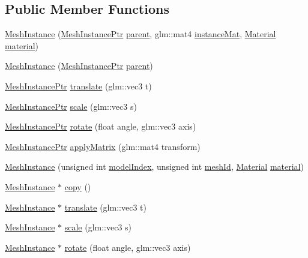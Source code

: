 \subsection*{Public Member Functions}
\begin{DoxyCompactItemize}
\item 
\hyperlink{class_mesh_instance_a0433e083188a2bef4f193032bba3b21f}{Mesh\+Instance} (\hyperlink{class_mesh_instance_ptr}{Mesh\+Instance\+Ptr} \hyperlink{class_mesh_instance_ad248a44f589cbeb5a8ec8748afebdcd8}{parent}, glm\+::mat4 \hyperlink{class_mesh_instance_a4ed7a3e07affd6862213ff054caa1b30}{instance\+Mat}, \hyperlink{struct_material}{Material} \hyperlink{class_mesh_instance_adba237cd83810b3afa89f1b911997e17}{material})
\item 
\hyperlink{class_mesh_instance_a9489df3dba59756832ad3789d6ae6b19}{Mesh\+Instance} (\hyperlink{class_mesh_instance_ptr}{Mesh\+Instance\+Ptr} \hyperlink{class_mesh_instance_ad248a44f589cbeb5a8ec8748afebdcd8}{parent})
\item 
\hyperlink{class_mesh_instance_ptr}{Mesh\+Instance\+Ptr} \hyperlink{class_mesh_instance_a0fa7328a13f39ddecefbd791bb8a60d4}{translate} (glm\+::vec3 t)
\item 
\hyperlink{class_mesh_instance_ptr}{Mesh\+Instance\+Ptr} \hyperlink{class_mesh_instance_a2f326744ece4345c59cfa56823693440}{scale} (glm\+::vec3 s)
\item 
\hyperlink{class_mesh_instance_ptr}{Mesh\+Instance\+Ptr} \hyperlink{class_mesh_instance_a63c843a137a99cdb24a06c8d3951c8a5}{rotate} (float angle, glm\+::vec3 axis)
\item 
\hyperlink{class_mesh_instance_ptr}{Mesh\+Instance\+Ptr} \hyperlink{class_mesh_instance_a76c43b6e1efab3b95027fdf7fc17a97d}{apply\+Matrix} (glm\+::mat4 transform)
\item 
\hyperlink{class_mesh_instance_a130ba9587f476a8897f704eaed1ebded}{Mesh\+Instance} (unsigned int \hyperlink{class_mesh_instance_a969bc28f038cda422be9efe24c308b58}{model\+Index}, unsigned int \hyperlink{class_mesh_instance_aec954bfbb05fd9d2e4da020ca61b8c35}{mesh\+Id}, \hyperlink{struct_material}{Material} \hyperlink{class_mesh_instance_adba237cd83810b3afa89f1b911997e17}{material})
\item 
\hyperlink{class_mesh_instance}{Mesh\+Instance} $\ast$ \hyperlink{class_mesh_instance_afdb729a6fbb69dcbf75dd926344cecac}{copy} ()
\item 
\hyperlink{class_mesh_instance}{Mesh\+Instance} $\ast$ \hyperlink{class_mesh_instance_a61840ca9d6395ea62a2ea230306e0ed6}{translate} (glm\+::vec3 t)
\item 
\hyperlink{class_mesh_instance}{Mesh\+Instance} $\ast$ \hyperlink{class_mesh_instance_a4968f7898f2eaa54921b08313fc79d31}{scale} (glm\+::vec3 s)
\item 
\hyperlink{class_mesh_instance}{Mesh\+Instance} $\ast$ \hyperlink{class_mesh_instance_a26db238575ab880fdc81d128051e6011}{rotate} (float angle, glm\+::vec3 axis)
\end{DoxyCompactItemize}
